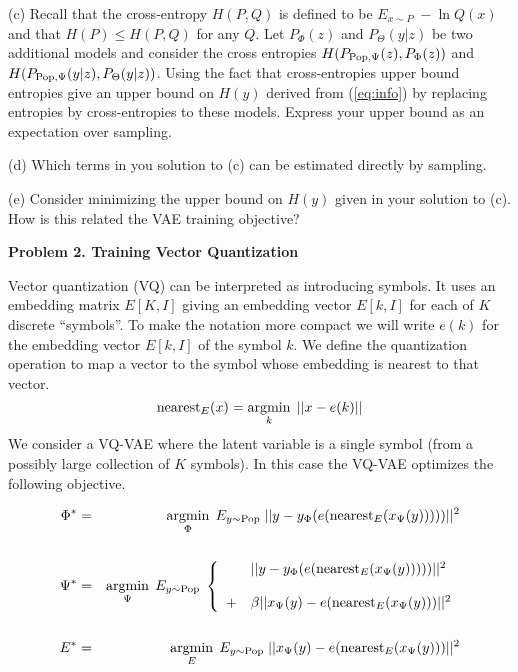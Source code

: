 \medskip

(c) Recall that the cross-entropy $H(P,Q)$ is defined to be $E_{x \sim P} \;-\ln Q(x)$ and that $H(P) \leq H(P,Q)$ for any $Q$.
Let $P_\Phi(z)$ and $P_\Theta(y|z)$ be two additional models and consider the cross entropies $H(P_{\mathrm{Pop},\Psi}(z),P_\Phi(z))$ and $H(P_{\mathrm{Pop},\Psi}(y|z),P_\Theta(y|z))$.
Using the fact that cross-entropies upper bound entropies give an upper bound on $H(y)$ derived from (\ref{eq:info}) by replacing entropies by cross-entropies to these models.
Express your upper bound as an expectation over sampling.



\medskip
(d) Which terms in you solution to (c) can be estimated directly by sampling.


\medskip
(e) Consider minimizing the upper bound on $H(y)$ given in your solution to (c).  How is this related the VAE training objective?


\bigskip

{\bf Problem 2. Training Vector Quantization}

Vector quantization (VQ) can be interpreted as introducing symbols.  It uses an embedding matrix $E[K,I]$ giving an embedding vector $E[k,I]$
for each of $K$ discrete ``symbols''.
To make the notation more compact we will write $e(k)$ for the embedding vector $E[k,I]$ of the symbol $k$.
We define the quantization operation to map a vector to the symbol whose embedding is nearest to that vector.
$$\mathrm{nearest}_E(x) = \operatorname*{argmin}_k\;||x - e(k)||$$
We consider a VQ-VAE where the latent variable is a single symbol (from a possibly large collection of $K$ symbols).  In this case the VQ-VAE optimizes the following objective.

\begin{eqnarray}
  \label{eq:VQPhi}
  \Phi^* & = & \operatorname*{argmin}_{\Phi}\;E_{y \sim \mathrm{Pop}}\; ||y-y_\Phi(e(\mathrm{nearest}_E(x_\Psi(y)))))||^2 \\
  \nonumber \\
  \label{eq:VQPsi}
  \Psi^* & = & \operatorname*{argmin}_{\Psi}\;E_{y \sim \mathrm{Pop}}\;\left\{\begin{array}{ll} &||y-y_\Phi(e(\mathrm{nearest}_E(x_\Psi(y)))))||^2
  \\ \\ + & \beta||x_\Psi(y) - e(\mathrm{nearest}_E(x_\Psi(y)))||^2\end{array}\right. \\
  \nonumber \\
  \label{eq:VQE}
  E^* & = & \operatorname*{argmin}_E \;E_{y \sim \mathrm{Pop}}\;||x_\Psi(y) - e(\mathrm{nearest}_E(x_\Psi(y)))||^2
\end{eqnarray}

